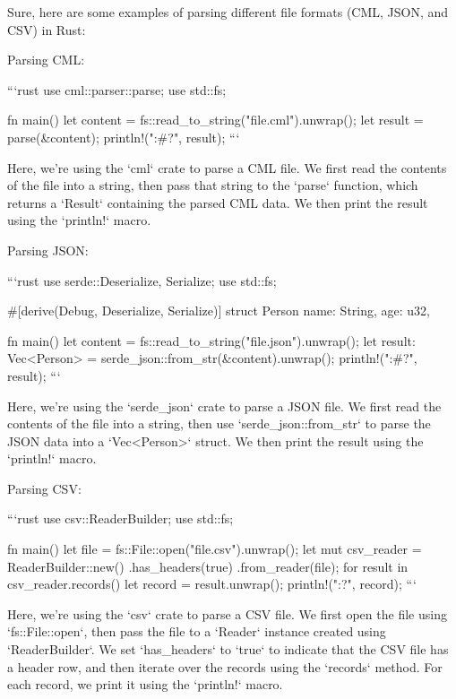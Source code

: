 Sure, here are some examples of parsing different file formats (CML, JSON, and CSV) in Rust:

Parsing CML:

```rust
use cml::parser::parse;
use std::fs;

fn main() {
    let content = fs::read_to_string("file.cml").unwrap();
    let result = parse(&content);
    println!("{:#?}", result);
}
```

Here, we're using the `cml` crate to parse a CML file. We first read the contents of the file into a string, then pass that string to the `parse` function, which returns a `Result` containing the parsed CML data. We then print the result using the `println!` macro.

Parsing JSON:

```rust
use serde::{Deserialize, Serialize};
use std::fs;

#[derive(Debug, Deserialize, Serialize)]
struct Person {
    name: String,
    age: u32,
}

fn main() {
    let content = fs::read_to_string("file.json").unwrap();
    let result: Vec<Person> = serde_json::from_str(&content).unwrap();
    println!("{:#?}", result);
}
```

Here, we're using the `serde_json` crate to parse a JSON file. We first read the contents of the file into a string, then use `serde_json::from_str` to parse the JSON data into a `Vec<Person>` struct. We then print the result using the `println!` macro.

Parsing CSV:

```rust
use csv::ReaderBuilder;
use std::fs;

fn main() {
    let file = fs::File::open("file.csv").unwrap();
    let mut csv_reader = ReaderBuilder::new()
        .has_headers(true)
        .from_reader(file);
    for result in csv_reader.records() {
        let record = result.unwrap();
        println!("{:?}", record);
    }
}
```

Here, we're using the `csv` crate to parse a CSV file. We first open the file using `fs::File::open`, then pass the file to a `Reader` instance created using `ReaderBuilder`. We set `has_headers` to `true` to indicate that the CSV file has a header row, and then iterate over the records using the `records` method. For each record, we print it using the `println!` macro.
